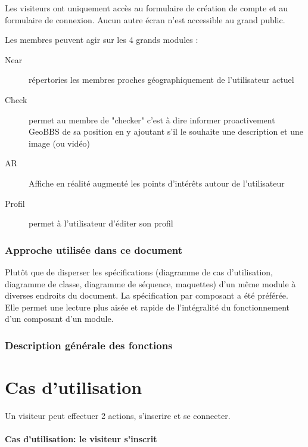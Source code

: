 \documentclass[a4paper,12pt]{report}
\begin{document}
\begin{onehalfspace}
Les visiteurs ont uniquement accès au formulaire de création de compte et au formulaire de connexion. Aucun autre écran n’est accessible au grand public.

Les membres peuvent agir sur les 4 grands modules :
\begin{description}
  \item[Near] répertories les membres proches géographiquement de l'utilisateur actuel
  \item[Check] permet au membre de "checker" c'est à dire informer proactivement GeoBBS de sa position en y ajoutant s'il le souhaite une description et une image (ou vidéo)
  \item[AR] Affiche en réalité augmenté les points d'intérêts autour de l'utilisateur
  \item[Profil] permet à l'utilisateur d'éditer son profil
\end{description}

\subsection{Approche utilisée dans ce document} %
\label{sub:approche_utilis_e_dans_ce_document}
Plutôt que de disperser les spécifications (diagramme de cas d’utilisation, diagramme de classe, diagramme de séquence, maquettes) d’un même module à diverses endroits du document. La spécification par composant a été préférée. Elle permet une lecture plus aisée et rapide de l’intégralité du fonctionnement d’un composant d’un module.

\subsection{Description générale des fonctions} %
\label{sub:description_g_n_rale_des_fonctions}

\chapter{Cas d'utilisation}
Un visiteur peut effectuer 2 actions, s’inscrire et se connecter.

\subsubsection{Cas d'utilisation: le visiteur s'inscrit} %

\begin{tabular}{|p{3cm}|p{}|}
\hline %


\end{tabular}
\end{onehalfspace}
\end{document}
